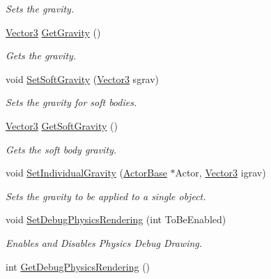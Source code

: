\begin{DoxyCompactItemize}
\begin{DoxyCompactList}\small\item\em Sets the gravity. \item\end{DoxyCompactList}\item 
\hyperlink{classphys_1_1Vector3}{Vector3} \hyperlink{classphys_1_1PhysicsManager_a880950ca6093afd3267dcadf30934574}{GetGravity} ()
\begin{DoxyCompactList}\small\item\em Gets the gravity. \item\end{DoxyCompactList}\item 
void \hyperlink{classphys_1_1PhysicsManager_acd1fe36f7cd593da0c466002304065eb}{SetSoftGravity} (\hyperlink{classphys_1_1Vector3}{Vector3} sgrav)
\begin{DoxyCompactList}\small\item\em Sets the gravity for soft bodies. \item\end{DoxyCompactList}\item 
\hyperlink{classphys_1_1Vector3}{Vector3} \hyperlink{classphys_1_1PhysicsManager_acdaad0849c3d6386e8cff5c98fc46664}{GetSoftGravity} ()
\begin{DoxyCompactList}\small\item\em Gets the soft body gravity. \item\end{DoxyCompactList}\item 
void \hyperlink{classphys_1_1PhysicsManager_af6acab3a35e52b1e25f1ab47f494d90d}{SetIndividualGravity} (\hyperlink{classphys_1_1ActorBase}{ActorBase} $\ast$Actor, \hyperlink{classphys_1_1Vector3}{Vector3} igrav)
\begin{DoxyCompactList}\small\item\em Sets the gravity to be applied to a single object. \item\end{DoxyCompactList}\item 
void \hyperlink{classphys_1_1PhysicsManager_a67fb59148a94ced0a92b288a638f89db}{SetDebugPhysicsRendering} (int ToBeEnabled)
\begin{DoxyCompactList}\small\item\em Enables and Disables Physics Debug Drawing. \item\end{DoxyCompactList}\item 
int \hyperlink{classphys_1_1PhysicsManager_a64f96d2e4b25c2b9a66042998bf334ff}{GetDebugPhysicsRendering} ()

\end{DoxyCompactItemize}
